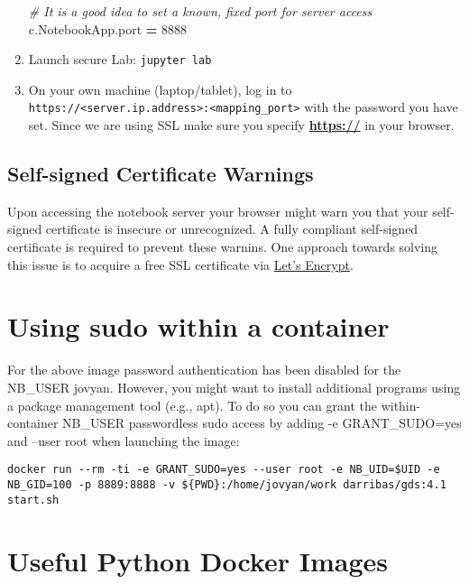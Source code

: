 \documentclass[
]{book}
\newenvironment{Shaded}{\begin{snugshade}}{\end{snugshade}}
\newcommand{\CommentTok}[1]{\textcolor[rgb]{0.56,0.35,0.01}{\textit{#1}}}
\newcommand{\DecValTok}[1]{\textcolor[rgb]{0.00,0.00,0.81}{#1}}
\newcommand{\NormalTok}[1]{#1}
\newcommand{\OperatorTok}[1]{\textcolor[rgb]{0.81,0.36,0.00}{\textbf{#1}}}
\begin{document}
\begin{enumerate}
\begin{Shaded}
\begin{Highlighting}[]
\CommentTok{\# It is a good idea to set a known, fixed port for server access}
\NormalTok{c.NotebookApp.port }\OperatorTok{=} \DecValTok{8888}
\end{Highlighting}
\end{Shaded}
\item
  Launch secure Lab: \texttt{jupyter\ lab}
\item
  On your own machine (laptop/tablet), log in to \texttt{https://\textless{}server.ip.address\textgreater{}:\textless{}mapping\_port\textgreater{}} with the password you have set. Since we are using SSL make sure you specify \textbf{\url{https://}} in your browser.
\end{enumerate}

\hypertarget{self-signed-certificate-warnings}{%
\subsection{Self-signed Certificate Warnings}\label{self-signed-certificate-warnings}}

Upon accessing the notebook server your browser might warn you that your self-signed certificate is
insecure or unrecognized. A fully compliant self-signed certificate is required to prevent these warnins.
One approach towards solving this issue is to acquire a free SSL certificate via
\href{https://jupyter-notebook.readthedocs.io/en/stable/public_server.html\#using-let-s-encrypt}{Let's Encrypt}.

\hypertarget{using-sudo-within-a-container}{%
\section{Using sudo within a container}\label{using-sudo-within-a-container}}

For the above image password authentication has been disabled for the NB\_USER jovyan. However, you might want to install additional programs using a package management tool (e.g., apt). To do so you can grant the within-container NB\_USER passwordless sudo access by adding -e GRANT\_SUDO=yes and --user root when launching the image:

\begin{verbatim}
docker run --rm -ti -e GRANT_SUDO=yes --user root -e NB_UID=$UID -e NB_GID=100 -p 8889:8888 -v ${PWD}:/home/jovyan/work darribas/gds:4.1 start.sh  
\end{verbatim}

\hypertarget{useful-python-docker-images}{%
\section{Useful Python Docker Images}\label{useful-python-docker-images}}
\end{document}
